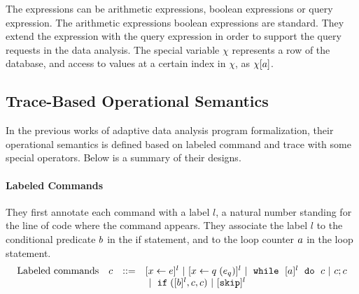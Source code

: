 The expressions can be arithmetic expressions, boolean expressions or query expression.
The arithmetic expressions boolean expressions are standard.
They extend the expression with the query expression in order to support the query requests in the data analysis.
The special variable $\chi$ represents a row of the database,
and access to values at a certain index in $\chi$, as $\chi[a]$.
%
\subsection*{Trace-Based Operational Semantics}
In the previous works of adaptive data analysis program formalization,
their operational semantics is defined based on labeled command and trace with some special operators.
Below is a summary of their designs.
\paragraph{Labeled Commands}
They first annotate each command with a label $l$,
a natural number standing for the line of code where the command appears.
They associate the label $l$ to the conditional predicate $b$ in the if statement,
and to the loop counter $a$ in the loop statement.
\[
\begin{array}{llll}
     \mbox{Labeled commands} & c & ::= &   [\mathrel{ x \leftarrow e }]^{l} ~|~  [\mathrel{ x \leftarrow q }(e_q)]^{l}
 ~|~  \;\mathtt{while}\; ~ [a]^{l} ~ \;\mathtt{do}\; ~ c  ~|~ c;c \\
 & & & ~|~ \;\mathtt{if}\;([b]^l, c, c) 	 ~|~ [\mathtt{skip}]^{l} \\
\end{array}
\]
